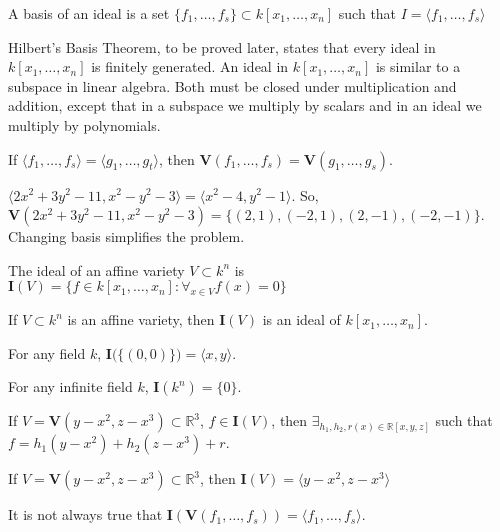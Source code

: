 \documentclass[crop=false,class=book]{standalone}
\begin{document}
\begin{definition}
A basis of an ideal is a set $\{f_1,\hdots, f_s\}\subset k[x_1,\hdots ,x_n]$ such that $I=\langle f_{1},\hdots,f_{s}\rangle$
\end{definition}
Hilbert's Basis Theorem, to be proved later, states that every ideal in $k[x_{1},\hdots,x_{n}]$ is finitely generated. An ideal in $k[x_{1},\hdots,x_{n}]$ is similar to a subspace in linear algebra. Both must be closed under multiplication and addition, except that in a subspace we multiply by scalars and in an ideal we multiply by polynomials. 
\begin{theorem}
If $\langle f_1,\hdots, f_s\rangle = \langle g_1,\hdots, g_t\rangle$, then $\mathbf{V}(f_1,\hdots, f_s) = \mathbf{V}(g_1,\hdots, g_s)$.
\end{theorem}
\begin{example}
$\langle2x^2+3y^2-11,x^2-y^2-3\rangle = \langle x^2-4,y^2-1\rangle$. So, $\mathbf{V}(2x^2+3y^2-11,x^2-y^2-3) = \{(2,1),(-2,1),(2,-1),(-2,-1)\}$. Changing basis simplifies the problem.
\end{example}
\begin{definition}
The ideal of an affine variety $V \subset k^n$ is $\mathbf{I}(V)=\{f\in k[x_1,\hdots ,x_n]:\forall_{x\in V}f(x)=0\}$
\end{definition}
\begin{theorem}
If $V\subset k^n$ is an affine variety, then $\mathbf{I}(V)$ is an ideal of $k[x_1,\hdots ,x_n]$.
\end{theorem}
\begin{theorem}
For any field $k$, $\mathbf{I}\big(\{(0,0)\}\big) = \langle x,y\rangle$.
\end{theorem}
\begin{theorem}
For any infinite field $k$, $\mathbf{I}(k^n) = \{0\}$.
\end{theorem}
\begin{theorem}
If $V = \mathbf{V}(y-x^2,z-x^3)\subset \mathbb{R}^3$, $f\in \mathbf{I}(V)$, then $\exists_{h_1,h_2,r(x)\in \mathbb{R}[x,y,z]}$ such that $f=h_1(y-x^2)+h_2(z-x^3)+r$.
\end{theorem}
\begin{theorem}
If $V = \mathbf{V}(y-x^2,z-x^3)\subset \mathbb{R}^3$, then $\mathbf{I}(V) = \langle y-x^2,z-x^3\rangle$
\end{theorem}
\begin{remark}
It is not always true that $\mathbf{I}(\mathbf{V}(f_1,\hdots, f_s)) = \langle f_1,\hdots, f_s\rangle$.
\end{remark}
\end{document}
